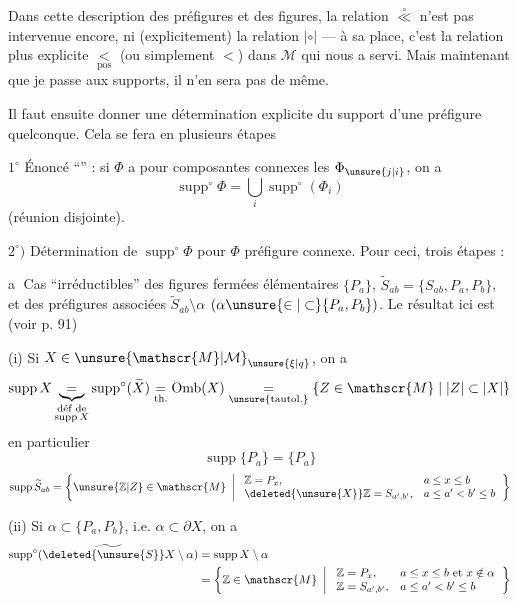 Dans cette description des préfigures et des figures, la relation $\overset{\circ}{\ll}$ n'est pas intervenue encore, ni (explicitement) la relation $\mathrel{|\circ|}$ --- à sa place, c'est la relation plus explicite $\underset{\mathrm{pos}}{<}$ (ou simplement $<$) dans $\mathscr{M}$ qui nous a servi. Mais maintenant que je passe aux supports, il n'en sera pas de même.

Il faut ensuite donner une détermination explicite du support d'une préfigure quelconque. Cela se fera en plusieurs étapes

\textcircled{\scriptsize $1^{\circ}$} Énoncé ``'' : si  $\Phi$ a pour composantes connexes les $\Phi_{\unsure{j|i}}$, on a
\[
\operatorname{supp}^{\circ}\Phi=\bigcup_i\operatorname{supp}^{\circ}(\Phi_i)
\]
(réunion disjointe).

$2^{\circ})$ Détermination de $\operatorname{supp}^{\circ}\Phi$ pour $\Phi$ préfigure connexe. Pour ceci, trois étapes :


\textcircled{a} Cas ``irréductibles'' des figures fermées élémentaires $\{P_a\}$, $\widetilde S_{ab}=\{S_{ab},P_a,P_b\}$, et des préfigures associées $\widetilde S_{ab}\setminus\alpha$ $(\alpha\unsure{\in|\subset}\{P_a,P_b\})$.
Le résultat ici est (voir p. 91)

(i) Si $X\in\unsure{\mathscr{M}|\mathcal{M}}_{\unsure{\xi|q}}$, on a
\[
\operatorname{supp}X\underbrace{=}_{\substack{\text{déf de}\\\operatorname{supp}X}}\operatorname{supp}^{\circ}(\widetilde X)
\underset{\text{th.}}{=}\operatorname{Omb}(X)
\underset{\text{\unsure{tautol.}}}{=}\{Z\in\mathscr{M}\mid |Z|\subset|X|\}
\]
en particulier
\[
\operatorname{supp}\{P_a\}=\{P_a\}
\]
\[
\operatorname{supp}\widetilde S_{ab}=\left\{\unsure{\mathbb{Z}|Z}\in\mathscr{M}\ \left|\
\begin{array}{ll}
\mathbb{Z}=P_x,&a\leq x\leq b\\
\deleted{\unsure{X}}\mathbb{Z}=S_{a',b'},&a\leq a'<b'\leq b
\end{array}\right.\right\}
\]

(ii) Si  $\alpha\subset\{P_a,P_b\}$, i.e. $\alpha\subset\partial X$, on a
\[
\begin{aligned}
\operatorname{supp}^{\circ}(\widetilde{\deleted{\unsure{S}}X}\setminus\alpha)&=\operatorname{supp}X\setminus\alpha\\
&=\left\{\mathbb{Z}\in\mathscr{M}\ \left|\
\begin{array}{ll}
\mathbb{Z}=P_x,&a\leq x\leq b\text{ et }x\notin\alpha\\
\mathbb{Z}=S_{a',b'},&a\leq a'<b'\leq b
\end{array}\right.\right\}
\end{aligned}
\]

